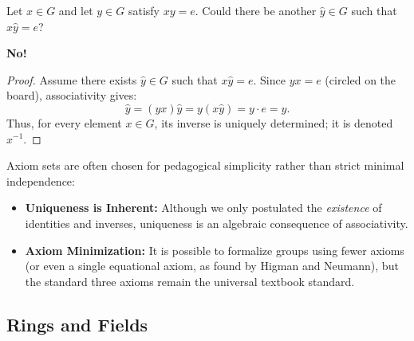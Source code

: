\begin{content}
\begin{question}
Let $x \in G$ and let $y \in G$ satisfy $xy = e$. Could there be another $\hat{y} \in G$ such that $x\hat{y} = e$?
\end{question}

\begin{answer}
\textbf{No!}
\begin{proof}
Assume there exists $\hat{y} \in G$ such that $x\hat{y} = e$. Since $yx = e$ (circled on the board), associativity gives:
\[
\hat{y} = (yx)\hat{y} = y(x\hat{y}) = y \cdot e = y.
\]
Thus, for every element $x \in G$, its inverse is uniquely determined; it is denoted $x^{-1}$.
\end{proof}
\end{answer}

\begin{steps}
Axiom sets are often chosen for pedagogical simplicity rather than strict minimal independence:
\begin{itemize}
    \item \textbf{Uniqueness is Inherent:} Although we only postulated the \emph{existence} of identities and inverses, uniqueness is an algebraic consequence of associativity.
    \item \textbf{Axiom Minimization:} It is possible to formalize groups using fewer axioms (or even a single equational axiom, as found by Higman and Neumann), but the standard three axioms remain the universal textbook standard.
\end{itemize}
\end{steps}
\end{content}

\subsection{Rings and Fields}

